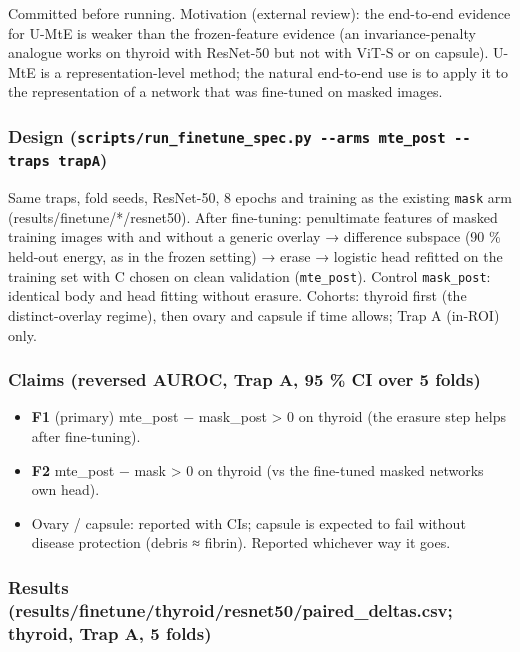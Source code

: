 {\small
Committed before running. Motivation (external review): the end-to-end evidence for U-MtE is weaker than the
frozen-feature evidence (an invariance-penalty analogue works on thyroid with ResNet-50 but not with ViT-S or on
capsule). U-MtE is a representation-level method; the natural end-to-end use is to apply it to the representation of
a network that was fine-tuned on masked images.

\subsubsection{\texorpdfstring{Design (\texttt{scripts/run\_finetune\_spec.py\ -\/-arms\ mte\_post\ -\/-traps\ trapA})}{Design (scripts/run\_finetune\_spec.py -\/-arms mte\_post -\/-traps trapA)}}\label{design-scriptsrun_finetune_specpy---arms-mte_post---traps-trapa}

Same traps, fold seeds, ResNet-50, 8 epochs and training as the existing \texttt{mask} arm (results/finetune/*/resnet50).
After fine-tuning: penultimate features of masked training images with and without a generic overlay → difference
subspace (90 \% held-out energy, as in the frozen setting) → erase → logistic head refitted on the training set with
C chosen on clean validation (\texttt{mte\_post}). Control \texttt{mask\_post}: identical body and head fitting without erasure.
Cohorts: thyroid first (the distinct-overlay regime), then ovary and capsule if time allows; Trap A (in-ROI) only.

\subsubsection{Claims (reversed AUROC, Trap A, 95 \% CI over 5 folds)}\label{claims-reversed-auroc-trap-a-95--ci-over-5-folds}

\begin{itemize}

\item
  \textbf{F1} (primary) mte\_post − mask\_post \textgreater{} 0 on thyroid (the erasure step helps after fine-tuning).
\item
  \textbf{F2} mte\_post − mask \textgreater{} 0 on thyroid (vs the fine-tuned masked network\textquotesingle s own head).
\item
  Ovary / capsule: reported with CIs; capsule is expected to fail without disease protection (debris ≈ fibrin).
  Reported whichever way it goes.
\end{itemize}

\subsubsection{Results (results/finetune/thyroid/resnet50/paired\_deltas.csv; thyroid, Trap A, 5 folds)}\label{results-resultsfinetunethyroidresnet50paired_deltascsv-thyroid-trap-a-5-folds}

}
